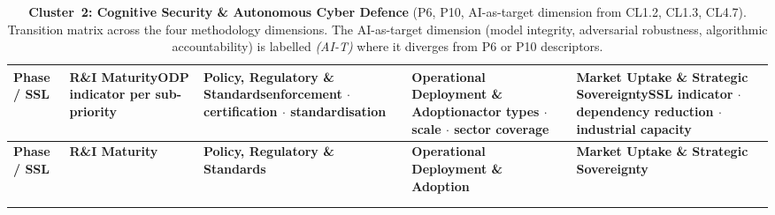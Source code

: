 \begin{landscape}
\setlength{\textwidth}{26.5cm}\setlength{\linewidth}{26.5cm}%
\setlength{\hsize}{26.5cm}\setlength{\columnwidth}{26.5cm}
\setlength{\tabcolsep}{5pt}
\renewcommand{\arraystretch}{1.35}

\begin{longtable}{%
|>{\footnotesize\raggedright\arraybackslash}p{2.8cm}%
|>{\footnotesize\raggedright\arraybackslash}p{5.4cm}%
|>{\footnotesize\raggedright\arraybackslash}p{5.4cm}%
|>{\footnotesize\raggedright\arraybackslash}p{5.4cm}%
|>{\footnotesize\raggedright\arraybackslash}p{5.4cm}|}

\caption{\textbf{Cluster~2: Cognitive Security \& Autonomous Cyber Defence}
(P6, P10, AI-as-target dimension from CL1.2, CL1.3, CL4.7).
Transition matrix across the four methodology dimensions. The AI-as-target
dimension (model integrity, adversarial robustness, algorithmic accountability)
is labelled \textit{(AI-T)} where it diverges from P6 or P10 descriptors.}
\label{tab:cluster2}\\

\hline
\rowcolor{colheader}
\textbf{Phase / SSL} &
\textbf{R\&I Maturity}{\scriptsize ODP indicator per sub-priority} &
\textbf{Policy, Regulatory \& Standards}{\scriptsize enforcement $\cdot$
  certification $\cdot$ standardisation} &
\textbf{Operational Deployment \& Adoption}{\scriptsize actor types $\cdot$
  scale $\cdot$ sector coverage} &
\textbf{Market Uptake \& Strategic Sovereignty}{\scriptsize SSL indicator
  $\cdot$ dependency reduction $\cdot$ industrial capacity} \\
\hline
\endfirsthead

\hline
\rowcolor{colheader}
\textbf{Phase / SSL} &
\textbf{R\&I Maturity} &
\textbf{Policy, Regulatory \& Standards} &
\textbf{Operational Deployment \& Adoption} &
\textbf{Market Uptake \& Strategic Sovereignty} \\
\hline
\endhead
\hline\multicolumn{5}{r}{\footnotesize\textit{Continued\ldots}}\\ \endfoot
\hline \endlastfoot


\end{longtable}
\end{landscape}
